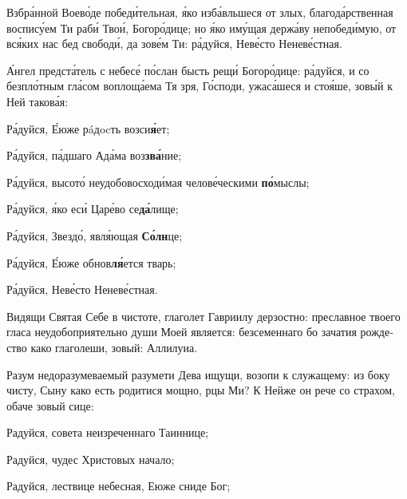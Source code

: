 \begin{russian}


  Взбра́нной Воево́де победи́тельная, я́ко изба́вльшеся от злых, благода́рственная воспису́ем Ти раби́ Твои́, Богоро́дице; но я́ко иму́щая держа́ву непобеди́мую, от вся́ких нас бед свободи́, да зове́м Ти: ра́дуйся, Неве́сто Неневе́стная.


  \Ierei А́нгел предста́тель с небесе́ по́слан бысть рещи́ Богоро́дице: ра́дуйся, и со безпло́тным гла́сом воплоща́ема Тя зря, Го́споди, ужаса́шеся и стоя́ше, зовы́й к Ней такова́я:

  \KhorRaduisya Ра́дуйся, Е́юже рáдocть возси\textbf{я́}ет;


  Ра́дуйся, па́дшаго Ада́ма воз\textbf{зва́}ние;


  Ра́дуйся, высото́ неудобовосходи́мая челове́ческими \textbf{по́}мыслы;


  Ра́дуйся, я́ко еси́ Царе́во се\textbf{да́}лище;


  Ра́дуйся, Звездо́, явля́ющая \textbf{Со́лн}це;


  Ра́дуйся, Е́юже обнов\textbf{ля́}ется тварь;


  Ра́дуйся, Неве́сто Неневе́стная.


  \Ierei Видящи Святая Себе в чистоте, глаголет Гавриилу дерзостно: преславное твоего гласа неудобоприятельно души Моей является: безсеменнаго бо зачатия рождество како глаголеши, зовый: Аллилуиа.


  \Ierei Разум недоразумеваемый разумети Дева ищущи, возопи к служащему: из боку чисту, Сыну како есть родитися мощно, рцы Ми? К Нейже он рече со страхом, обаче зовый сице:

  \KhorRaduisya Радуйся, совета неизреченнаго Таиннице;


  Радуйся, чудес Христовых начало;


  Радуйся, лествице небесная, Еюже сниде Бог;


\end{russian}
\pagebreak

